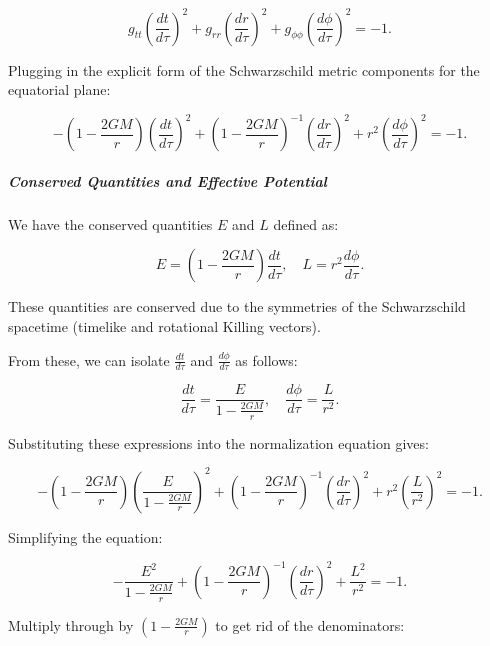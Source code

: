 \begin{equation}
g_{tt}\left(\frac{dt}{d\tau}\right)^2 + g_{rr}\left(\frac{dr}{d\tau}\right)^2 + g_{\phi\phi}\left(\frac{d\phi}{d\tau}\right)^2 = -1.
\end{equation}

Plugging in the explicit form of the Schwarzschild metric components for the equatorial plane:

\begin{equation}
-\left(1 - \frac{2GM}{r}\right)\left(\frac{dt}{d\tau}\right)^2 + \left(1 - \frac{2GM}{r}\right)^{-1} \left(\frac{dr}{d\tau}\right)^2 + r^2 \left(\frac{d\phi}{d\tau}\right)^2 = -1.
\end{equation}

\subparagraph{Conserved Quantities and Effective Potential}

We have the conserved quantities \(E\) and \(L\) defined as:

\begin{equation}
E = \left(1 - \frac{2GM}{r}\right) \frac{dt}{d\tau},
\quad
L = r^2 \frac{d\phi}{d\tau}.
\end{equation}

These quantities are conserved due to the symmetries of the Schwarzschild spacetime (timelike and rotational Killing vectors).

From these, we can isolate \(\frac{dt}{d\tau}\) and \(\frac{d\phi}{d\tau}\) as follows:

\begin{equation}
\frac{dt}{d\tau} = \frac{E}{1 - \frac{2GM}{r}},
\quad
\frac{d\phi}{d\tau} = \frac{L}{r^2}.
\end{equation}

Substituting these expressions into the normalization equation gives:

\begin{equation}
-\left(1 - \frac{2GM}{r}\right) \left( \frac{E}{1-\frac{2GM}{r}} \right)^2 + \left( 1- \frac{2GM}{r} \right)^{-1} \left( \frac{dr}{d\tau} \right)^2 + r^2 \left( \frac{L}{r^2} \right)^2 = -1.
\end{equation}

Simplifying the equation:

\begin{equation}
-\frac{E^2}{1-\frac{2GM}{r}} + \left( 1- \frac{2GM}{r} \right)^{-1} \left( \frac{dr}{d\tau} \right)^2 + \frac{L^2}{r^2} = -1.
\end{equation}

Multiply through by $\left( 1- \frac{2GM}{r} \right)$ to get rid of the denominators:

